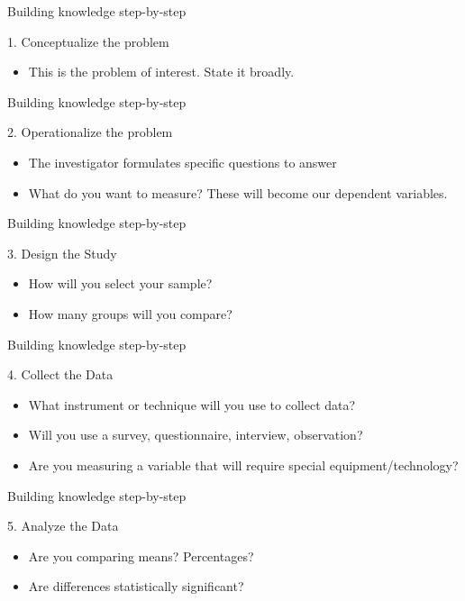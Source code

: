 \documentclass[14pt]{beamer}\usepackage[]{graphicx}\usepackage[]{color}
\begin{document}
\begin{frame}[fragile]{Building knowledge step-by-step}

1. Conceptualize the problem

\begin{itemize}
\item This is the problem of interest.  State it broadly.
\end{itemize}
\end{frame}

\begin{frame}[fragile]{Building knowledge step-by-step}

2. Operationalize the problem

\begin{itemize}
\item The investigator formulates specific questions to answer
\item What do you want to measure?  These will become our dependent variables.
\end{itemize}
\end{frame}

\begin{frame}[fragile]{Building knowledge step-by-step}

3. Design the Study

\begin{itemize}
\item How will you select your sample?
\item How many groups will you compare?
\end{itemize}
\end{frame}

\begin{frame}[fragile]{Building knowledge step-by-step}

4. Collect the Data

\begin{itemize}
\item What instrument or technique will you use to collect data?
\item Will you use a survey, questionnaire, interview, observation?
\item Are you measuring a variable that will require special equipment/technology?
\end{itemize}
\end{frame}

\begin{frame}[fragile]{Building knowledge step-by-step}

5. Analyze the Data

\begin{itemize}
\item Are you comparing means? Percentages?
\item Are differences statistically significant?
\end{itemize}
\end{frame}
\end{document}
